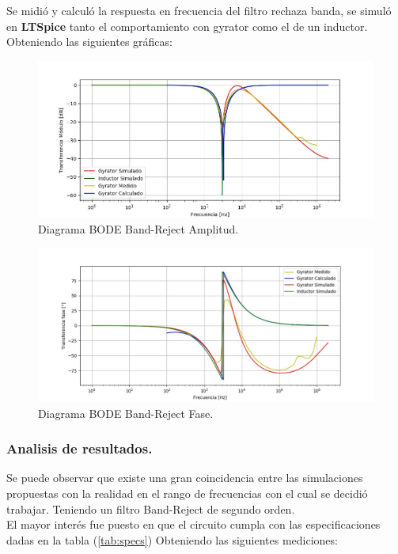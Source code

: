 \documentclass[a4paper]{article}
\begin{document}
Se midió y calculó la respuesta en frecuencia del filtro rechaza banda, se simuló en \textbf{LTSpice}  tanto el comportamiento con gyrator como el de un inductor. Obteniendo las siguientes gráficas:
\begin{figure}[H]	
	\centering
	\includegraphics[width=\textwidth]{ImagenesEj2/bodebr.jpg}
	\caption{Diagrama BODE Band-Reject Amplitud.}
	\label{fig:bodebr}
\end{figure}
\begin{figure}[H]	
	\centering
	\includegraphics[width=\textwidth]{ImagenesEj2/bodebrp.jpg}
	\caption{Diagrama BODE Band-Reject Fase.}
	\label{fig:bodebrp}
\end{figure}
\subsubsection{Analisis de resultados.}
Se puede observar que existe una gran coincidencia entre las simulaciones propuestas con la realidad en el rango de frecuencias con el cual se decidió trabajar. Teniendo un filtro Band-Reject de segundo orden.\\
El mayor interés fue puesto en que el circuito cumpla con las especificaciones dadas en la tabla (\ref{tab:specs})
Obteniendo las siguientes mediciones:
\end{document}
